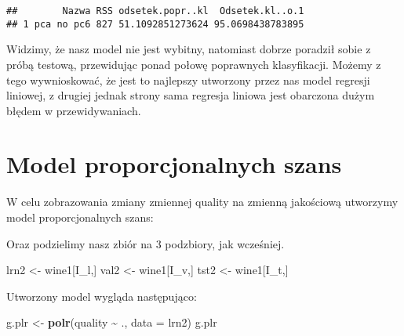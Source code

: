 \documentclass[
]{article}
\newenvironment{Shaded}{\begin{snugshade}}{\end{snugshade}}
\newcommand{\AttributeTok}[1]{\textcolor[rgb]{0.13,0.29,0.53}{#1}}
\newcommand{\FunctionTok}[1]{\textcolor[rgb]{0.13,0.29,0.53}{\textbf{#1}}}
\newcommand{\NormalTok}[1]{#1}
\newcommand{\OtherTok}[1]{\textcolor[rgb]{0.56,0.35,0.01}{#1}}
\newcommand{\SpecialCharTok}[1]{\textcolor[rgb]{0.81,0.36,0.00}{\textbf{#1}}}
\begin{document}
\begin{verbatim}
##        Nazwa RSS odsetek.popr..kl  Odsetek.kl..o.1
## 1 pca no pc6 827 51.1092851273624 95.0698438783895
\end{verbatim}

Widzimy, że nasz model nie jest wybitny, natomiast dobrze poradził sobie
z próbą testową, przewidując ponad połowę poprawnych klasyfikacji.
Możemy z tego wywnioskować, że jest to najlepszy utworzony przez nas
model regresji liniowej, z drugiej jednak strony sama regresja liniowa
jest obarczona dużym błędem w przewidywaniach.

\section{Model proporcjonalnych
szans}\label{model-proporcjonalnych-szans}

W celu zobrazowania zmiany zmiennej quality na zmienną jakościową
utworzymy model proporcjonalnych szans:

\begin{Shaded}
\end{Shaded}

Oraz podzielimy nasz zbiór na 3 podzbiory, jak wcześniej.

\begin{Shaded}
\begin{Highlighting}[]
\NormalTok{lrn2 }\OtherTok{\textless{}{-}}\NormalTok{ wine1[I\_l,]}
\NormalTok{val2 }\OtherTok{\textless{}{-}}\NormalTok{ wine1[I\_v,]}
\NormalTok{tst2 }\OtherTok{\textless{}{-}}\NormalTok{ wine1[I\_t,]}
\end{Highlighting}
\end{Shaded}

Utworzony model wygląda następująco:

\begin{Shaded}
\begin{Highlighting}[]
\NormalTok{g.plr }\OtherTok{\textless{}{-}} \FunctionTok{polr}\NormalTok{(quality }\SpecialCharTok{\textasciitilde{}}\NormalTok{ ., }\AttributeTok{data =}\NormalTok{ lrn2)}
\NormalTok{g.plr}
\end{Highlighting}
\end{Shaded}
\end{document}

